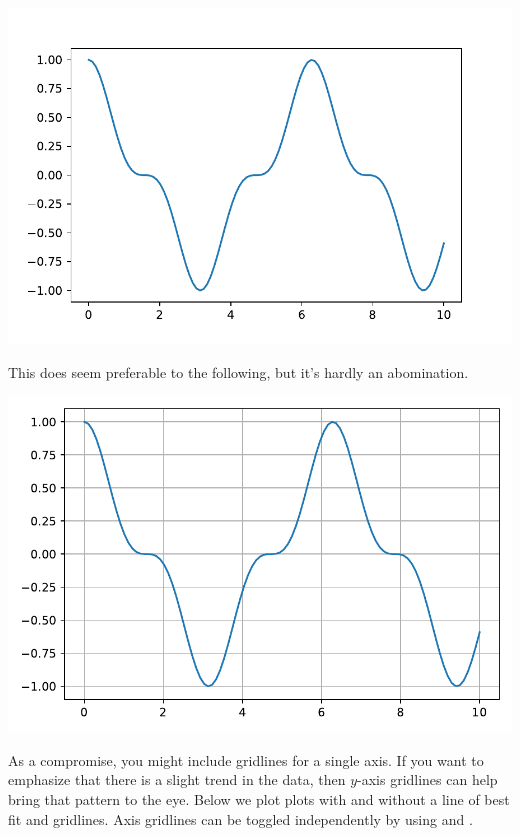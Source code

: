 
\begin{center}
    \includegraphics[width = .8\textwidth]{figures/proseplots/grid-false.pdf}
\end{center}

\noindent This does seem preferable to the following, but it's hardly an abomination. 


\begin{center}
    \includegraphics[width = .8\textwidth]{figures/proseplots/grid-true.pdf}
\end{center}

As a compromise, you might include gridlines for a single axis. If you want to emphasize that there is a slight trend in the data, then $y$-axis gridlines can help bring that pattern to the eye. Below we plot plots with and without a line of best fit and gridlines. Axis gridlines can be toggled independently by using  and . 



